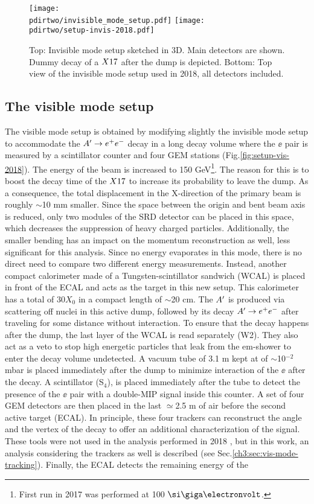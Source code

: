 \begin{figure}[tbh!]
  \centering
  \texttt{[image: \\pdirtwo/invisible\_mode\_setup.pdf]}
\texttt{[image: \\pdirtwo/setup-invis-2018.pdf]}
\caption[invisible mode setup 2018]{Top: Invisible mode setup sketched in 3D. Main detectors are shown. Dummy decay of a $X17$ after the dump is depicted. Bottom: Top view of the invisible mode setup used in 2018, all detectors included.}
\label{fig:setup-invis-2018}
\end{figure}

\subsection{The visible mode setup}
\label{ch2:sec:vismode}

The visible mode setup is obtained by modifying slightly the invisible mode setup to accommodate the $A' \to e^+e^-$ decay in a long decay volume where the $\ee$ pair is measured by a scintillator counter and four GEM stations (Fig.\ref{fig:setup-vis-2018}). The energy of the beam is increased to 150 GeV\footnote{First run in 2017 was performed at 100 $\gev$.}. The reason for this is to boost the decay time of the $X17$ to increase its probability to leave the dump. As a consequence, the total displacement in the X-direction of the primary beam is roughly $\sim$10 \si{mm} smaller. Since the space between the origin and bent beam axis is reduced, only two modules of the SRD detector can be placed in this space, which decreases the suppression of heavy charged particles. Additionally, the smaller bending has an impact on the momentum reconstruction as well, less significant for this analysis. Since no energy evaporates in this mode, there is no direct need to compare two different energy measurements. Instead, another compact calorimeter made of a Tungsten-scintillator sandwich (WCAL) is placed in front of the ECAL and acts as the target in this new setup. This calorimeter has a total of 30$X_0$ in a compact length of $\sim$20 \si{cm}. The $A'$ is produced via scattering off nuclei in this active dump, followed by its decay $A' \to e^+e^-$ after traveling for some distance without interaction. To ensure that the decay happens after the dump, the last layer of the WCAL is read separately (W2). They also act as a veto to stop high energetic particles that leak from the em-shower to enter the decay volume undetected. A vacuum tube of 3.1 \si{m} kept at of $\sim$10$^{-2}$ \si{mbar} is placed immediately after the dump to minimize interaction of the $\ee$ after the decay. A scintillator (S$_4$), is placed immediately after the tube to detect the presence of the $\ee$ pair with a double-MIP signal inside this counter. A set of four GEM detectors are then placed in the last $\simeq$2.5 \si{m} of air before the second active target (ECAL). In principle, these four trackers can reconstruct the angle and the vertex of the decay to offer an additional characterization of the signal. These tools were not used in the analysis performed in 2018 \cite{Banerjee:2019hmi}, but in this work, an analysis considering the trackers as well is described (see Sec.\ref{ch3:sec:vis-mode-tracking}). Finally, the ECAL detects the remaining energy of the 